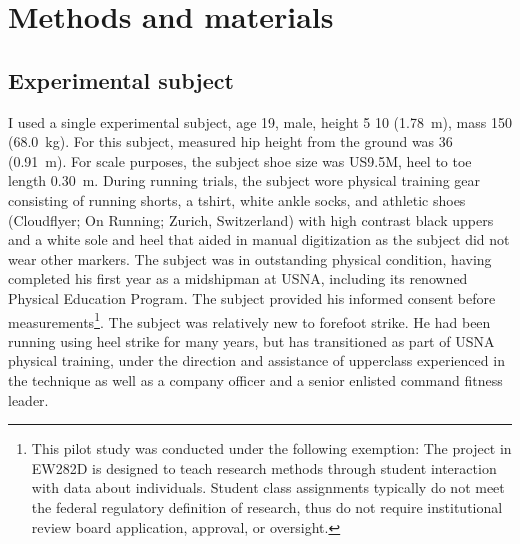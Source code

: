 \section{Methods and materials}
\label{sec:methods}

\subsection{Experimental subject}
I used a single experimental subject, age \SI{19}{\year}, male, height \SI{5}{\foot} \SI{10}{\inch} (\SI{1.78}{\meter}), mass \SI{150}{\pound} (\SI{68.0}{\kilo\gram}). For this subject, measured hip height from the ground was \SI{36}{\inch} (\SI{0.91}{\meter}). For scale purposes, the subject shoe size was US9.5M, heel to toe length \SI{0.30}{\meter}. During running trials, the subject wore physical training gear consisting of running shorts, a tshirt, white ankle socks, and athletic shoes (Cloudflyer; On Running; Zurich, Switzerland) with high contrast black uppers and a white sole and heel that aided in manual digitization as the subject did not wear other markers. The subject was in outstanding physical condition, having completed his first year as a midshipman at USNA, including its renowned Physical Education Program. The subject provided his informed consent before measurements\footnote{This pilot study was conducted under the following exemption: The project in EW282D is designed to teach research methods through student interaction with data about individuals. Student class assignments typically do not meet the federal regulatory definition of research, thus do not require institutional review board application, approval, or oversight.}.  The subject was relatively new to forefoot strike. He had been running using heel strike for many years, but has transitioned as part of USNA physical training, under the direction and assistance of upperclass experienced in the technique as well as a company officer and a senior enlisted command fitness leader. 


